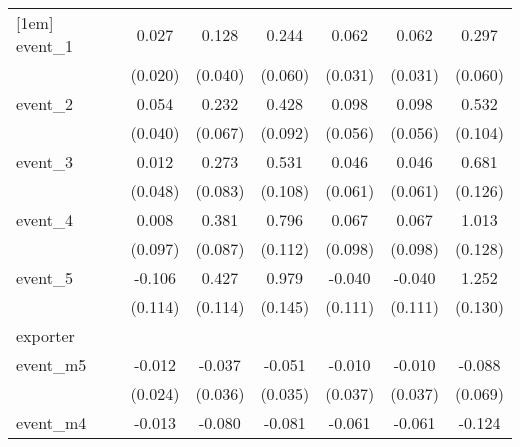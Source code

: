 {\begin{tabular}{l*{6}{c}}
[1em]
event\_1     &       0.027         &       0.128\sym{**} &       0.244\sym{***}&       0.062\sym{*}  &       0.062\sym{*}  &       0.297\sym{***}\\
            &     (0.020)         &     (0.040)         &     (0.060)         &     (0.031)         &     (0.031)         &     (0.060)         \\
[1em]
event\_2     &       0.054         &       0.232\sym{***}&       0.428\sym{***}&       0.098         &       0.098         &       0.532\sym{***}\\
            &     (0.040)         &     (0.067)         &     (0.092)         &     (0.056)         &     (0.056)         &     (0.104)         \\
[1em]
event\_3     &       0.012         &       0.273\sym{**} &       0.531\sym{***}&       0.046         &       0.046         &       0.681\sym{***}\\
            &     (0.048)         &     (0.083)         &     (0.108)         &     (0.061)         &     (0.061)         &     (0.126)         \\
[1em]
event\_4     &       0.008         &       0.381\sym{***}&       0.796\sym{***}&       0.067         &       0.067         &       1.013\sym{***}\\
            &     (0.097)         &     (0.087)         &     (0.112)         &     (0.098)         &     (0.098)         &     (0.128)         \\
[1em]
event\_5     &      -0.106         &       0.427\sym{***}&       0.979\sym{***}&      -0.040         &      -0.040         &       1.252\sym{***}\\
            &     (0.114)         &     (0.114)         &     (0.145)         &     (0.111)         &     (0.111)         &     (0.130)         \\
\hline
exporter    &                     &                     &                     &                     &                     &                     \\
event\_m5    &      -0.012         &      -0.037         &      -0.051         &      -0.010         &      -0.010         &      -0.088         \\
            &     (0.024)         &     (0.036)         &     (0.035)         &     (0.037)         &     (0.037)         &     (0.069)         \\
[1em]
event\_m4    &      -0.013         &      -0.080\sym{***}&      -0.081         &      -0.061\sym{*}  &      -0.061\sym{*}  &      -0.124\sym{**} \\

\end{tabular}}
